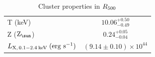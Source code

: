 \begin{table}
	\centering
	\caption{Cluster properties in $R_{\rm 500}$ 	\label{tab:global}}
	\begin{tabular}{lc}
		\hline
			T  (keV) &   $10.06_{-0.49}^{+0.50}$ \\
			Z (${\rm Z}_\sun$) & $0.24_{-0.04}^{+0.05}$ \\
			$L_{\rm X,\, 0.1-2.4\: {\rm keV}}\; {\rm (erg\,\,s^{-1})}$ & $\left(9.14\pm 0.10\right)\times 10^{44}$\\
		\hline
	\end{tabular}
\end{table}
